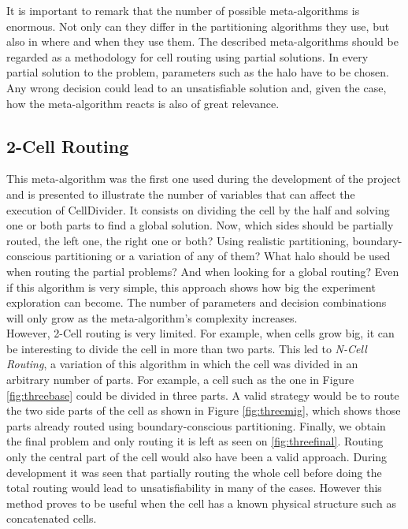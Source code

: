 It is important to remark that the number of possible meta-algorithms is enormous. Not only can they differ in the partitioning algorithms they use, but also in where and when they use them. The described meta-algorithms should be regarded as a methodology for cell routing using partial solutions. In every partial solution to the problem, parameters such as the halo have to be chosen. Any wrong decision could lead to an unsatisfiable solution and, given the case, how the meta-algorithm reacts is also of great relevance. \\



\subsection{2-Cell Routing}

This meta-algorithm was the first one used during the development of the project and is presented to illustrate the number of variables that can affect the execution of CellDivider. It consists on dividing the cell by the half and solving one or both parts to find a global solution. Now, which sides should be partially routed, the left one, the right one or both? Using realistic partitioning, boundary-conscious partitioning or a variation of any of them? What halo should be used when routing the partial problems? And when looking for a global routing? Even if this algorithm is very simple, this approach shows how big the experiment exploration can become. The number of parameters and decision combinations will only grow as the meta-algorithm's complexity increases. \\

However, 2-Cell routing is very limited. For example, when cells grow big, it can be interesting to divide the cell in more than two parts. This led to \textit{N-Cell Routing}, a variation of this algorithm in which the cell was divided in an arbitrary number of parts. For example, a cell such as the one in Figure \ref{fig:threebase} could be divided in three parts. A valid strategy would be to route the two side parts of the cell as shown in Figure \ref{fig:threemig}, which shows those parts already routed using boundary-conscious partitioning. Finally, we obtain the final problem and only routing it is left as seen on \ref{fig:threefinal}. Routing only the central part of the cell would also have been a valid approach. During development it was seen that partially routing the whole cell before doing the total routing would lead to unsatisfiability in many of the cases. However this method proves to be useful when the cell has a known physical structure such as concatenated cells. \\

